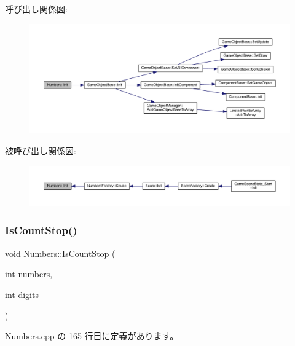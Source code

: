 呼び出し関係図\+:\nopagebreak
\begin{figure}[H]
\begin{center}
\leavevmode
\includegraphics[width=350pt]{class_numbers_a42158aa8dbb71308161c642aed8752e8_cgraph}
\end{center}
\end{figure}
被呼び出し関係図\+:\nopagebreak
\begin{figure}[H]
\begin{center}
\leavevmode
\includegraphics[width=350pt]{class_numbers_a42158aa8dbb71308161c642aed8752e8_icgraph}
\end{center}
\end{figure}
\mbox{\label{class_numbers_ab172b8637d38b710a4ff6dd3808522e0}} 
\subsubsection{\texorpdfstring{Is\+Count\+Stop()}{IsCountStop()}}
{\footnotesize\ttfamily void Numbers\+::\+Is\+Count\+Stop (\begin{DoxyParamCaption}\item[{int}]{numbers,  }\item[{int}]{digits }\end{DoxyParamCaption})\hspace{0.3cm}{\ttfamily [private]}}



 Numbers.\+cpp の 165 行目に定義があります。

